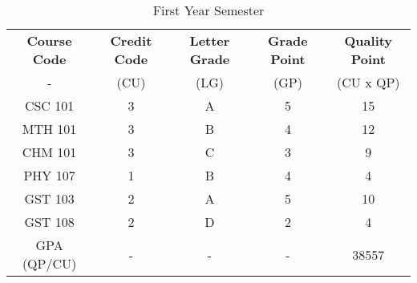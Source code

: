 \documentclass{article}
\begin{document}
\begin{table}[h!]
	\begin{center}
		\caption{First Year Semester}
		\label{tab:table}
		\begin{tabular}{c|c|c|c|c} %
			\textbf{Course Code} & \textbf{Credit Code} & \textbf{Letter Grade} & \textbf{Grade Point} & \textbf{Quality Point}\\ - & (CU) & (LG) & (GP) & (CU x QP) \\
			\hline
			CSC 101 & 3 & A & 5 & 15\\
			MTH 101 & 3 & B & 4 & 12\\
			CHM 101 & 3 & C & 3 & 9\\
			PHY 107 & 1 & B & 4 & 4\\
			GST 103 & 2 & A & 5 & 10\\
			GST 108 & 2 & D & 2 & 4\\
			GPA (QP/CU) & - & - & - & 38557\\
			 
		\end{tabular}
	\end{center}
\end{table}
\end{document}
